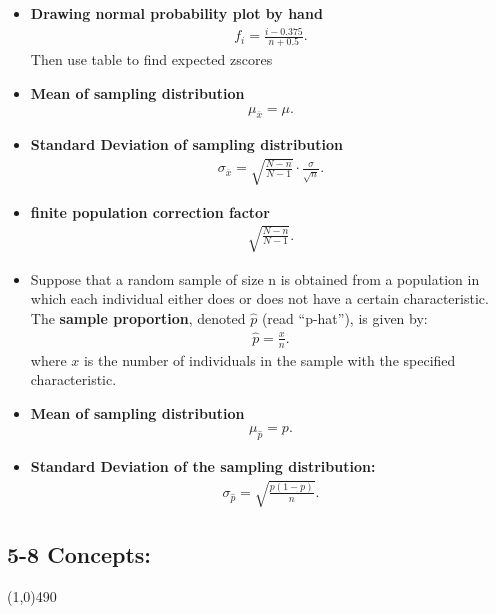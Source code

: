 \documentclass{report}
\begin{document}
\begin{itemize}
              \item \textbf{Drawing normal probability plot by hand}
                \begin{align*}
                  f_{i} = \frac{i - 0.375}{n + 0.5}
                .\end{align*}
                Then use table to find expected zscores
                        \item \textbf{Mean of sampling distribution}
            \begin{align*}
                \mu_{\overline{x}} = \mu
            .\end{align*}
        \item \textbf{Standard Deviation of sampling distribution}
            \begin{align*}
                \sigma_{\overline{x}} = \sqrt{\frac{N-n}{N-1}} \cdot \frac{\sigma}{\sqrt{n}}
            .\end{align*}
        \item \textbf{finite population correction factor}
            \begin{align*}
                \sqrt{\frac{N-n}{N-1}}
            .\end{align*}
                     \item Suppose that a random sample of size n is obtained from a population in which each individual either does or does not have a certain characteristic. The \textbf{sample proportion}, denoted $\hat{p}$ (read “p-hat”), is given by:
             \begin{align*}
                 \hat{p} = \frac{x}{n}
             .\end{align*}
            where $x $ is the number of individuals in the sample with the specified characteristic. 
        \item \textbf{Mean of sampling distribution}
            \begin{align*}
                \mu_{\hat{p}} = p
            .\end{align*}
        \item \textbf{Standard Deviation of the sampling distribution:}
            \begin{align*}
               \sigma_{\hat{p}} = \sqrt{\frac{p(1-p)}{n}} 
            .\end{align*}     
    \end{itemize}


    \pagebreak 
    \begin{center}
      \subsection*{5-8 Concepts:}
    \end{center}
    \line(1,0){490}
    \bigbreak \noindent
\end{document}
